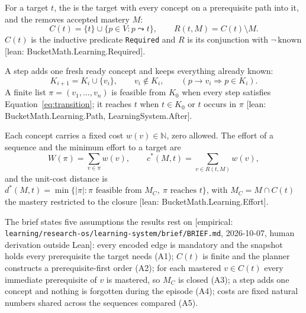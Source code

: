 \documentclass[11pt]{article}
\newcommand{\emp}[1]{\textcolor{bucketgray}{\footnotesize [empirical: #1]}}
\newcommand{\bm}[1]{\textcolor{bucketgray}{\footnotesize [lean: #1]}}
\newcommand{\brief}{\emp{\texttt{learning/\allowbreak research-os/\allowbreak learning-system/\allowbreak brief/\allowbreak BRIEF.\allowbreak md}, 2026-10-07, human derivation outside Lean}}
\begin{document}
\begin{definition}
\label{def:required}
For a target $t$, the  is the target with every concept on a prerequisite path into it, and the  removes accepted mastery $M$:
\begin{equation}
  C(t) = \{t\} \cup \{p \in V : p \leadsto t\}, \qquad R(t, M) = C(t) \setminus M .
  \label{eq:required}
\end{equation}
$C(t)$ is the inductive predicate \texttt{Required} and $R$ is its conjunction with $\neg\,\mathrm{known}$ \bm{BucketMath.Learning.Required}.
\end{definition}

\begin{definition}
\label{def:transition}
A step adds one fresh ready concept and keeps everything already known:
\begin{equation}
  K_{i+1} = K_i \cup \{v_i\}, \qquad v_i \notin K_i, \qquad (p \to v_i \Rightarrow p \in K_i).
  \label{eq:transition}
\end{equation}
A finite list $\pi = (v_1, \ldots, v_n)$ is feasible from $K_0$ when every step satisfies Equation~\eqref{eq:transition}; it reaches $t$ when $t \in K_0$ or $t$ occurs in $\pi$ \bm{BucketMath.Learning.Path, LearningSystem.After}.
\end{definition}

\begin{definition}
\label{def:cost}
Each concept carries a fixed cost $w(v) \in \mathbb{N}$, zero allowed. The effort of a sequence and the minimum effort to a target are
\begin{equation}
  W(\pi) = \sum_{v \in \pi} w(v), \qquad c^*(M, t) = \sum_{v \in R(t, M)} w(v),
  \label{eq:cost}
\end{equation}
and the unit-cost distance is $d^*(M, t) = \min\{|\pi| : \pi \text{ feasible from } M_C,\ \pi \text{ reaches } t\}$, with $M_C = M \cap C(t)$ the mastery restricted to the closure \bm{BucketMath.Learning.Effort}.
\end{definition}

The brief states five assumptions the results rest on \brief: every encoded edge is mandatory and the snapshot holds every prerequisite the target needs (A1); $C(t)$ is finite and the planner constructs a prerequisite-first order (A2); for each mastered $v \in C(t)$ every immediate prerequisite of $v$ is mastered, so $M_C$ is closed (A3); a step adds one concept and nothing is forgotten during the episode (A4); costs are fixed natural numbers shared across the sequences compared (A5).
\end{document}
